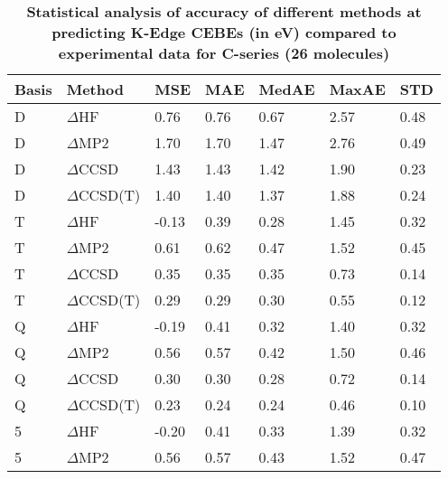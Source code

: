 \begin{table}
  \caption{\textbf{Statistical analysis of accuracy of different methods at predicting K-Edge CEBEs (in eV) compared to experimental data for C-series (26 molecules)}}
  \label{tbl:method-summary-c}
  \begin{tabular}{l l l l l l l }
    \toprule
    \textbf{Basis} & \textbf{Method} & \textbf{MSE} & \textbf{MAE} & \textbf{MedAE} & \textbf{MaxAE} & \textbf{STD} \\ 
    \midrule
    D & $\Delta$HF & 0.76 & 0.76 & 0.67 & 2.57 & 0.48 \\ 
    D & $\Delta$MP2 & 1.70 & 1.70 & 1.47 & 2.76 & 0.49 \\ 
    D & $\Delta$CCSD & 1.43 & 1.43 & 1.42 & 1.90 & 0.23 \\ 
    D & $\Delta$CCSD(T) & 1.40 & 1.40 & 1.37 & 1.88 & 0.24 \\ 
    T & $\Delta$HF & -0.13 & 0.39 & 0.28 & 1.45 & 0.32 \\ 
    T & $\Delta$MP2 & 0.61 & 0.62 & 0.47 & 1.52 & 0.45 \\ 
    T & $\Delta$CCSD & 0.35 & 0.35 & 0.35 & 0.73 & 0.14 \\ 
    T & $\Delta$CCSD(T) & 0.29 & 0.29 & 0.30 & 0.55 & 0.12 \\ 
    Q & $\Delta$HF & -0.19 & 0.41 & 0.32 & 1.40 & 0.32 \\ 
    Q & $\Delta$MP2 & 0.56 & 0.57 & 0.42 & 1.50 & 0.46 \\ 
    Q & $\Delta$CCSD & 0.30 & 0.30 & 0.28 & 0.72 & 0.14 \\ 
    Q & $\Delta$CCSD(T) & 0.23 & 0.24 & 0.24 & 0.46 & 0.10 \\ 
    5 & $\Delta$HF & -0.20 & 0.41 & 0.33 & 1.39 & 0.32 \\ 
    5 & $\Delta$MP2 & 0.56 & 0.57 & 0.43 & 1.52 & 0.47 \\ 
    \bottomrule
  \end{tabular}
\end{table}
